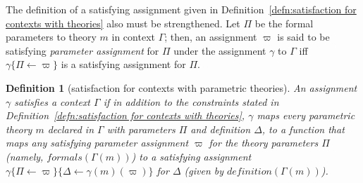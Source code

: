 \documentclass [12pt,twoside]{cslreport}
\newcommand{\thmbox}
   {{\ \hfill\hbox{%
      \vrule width1.0ex height1.0ex
   }\parfillskip 0pt }}
\newcommand{\Mgamma}[1]{{\mathcal M}(\Gamma\vbar\gamma)(#1)}
\newcommand{\tttype}{\mathtt{TYPE}}
\newcommand{\ttconstant}{\mathtt{CONSTANT}}
\newcommand{\itkind}{\textit{kind}}
\newcommand{\itdef}{\textit{definition}}
\newcommand{\itformals}{\textit{formals}}
\newcommand{\vbar}{\ |\ }
\newtheorem{definition}{Definition}
\newenvironment{Defn}[1]{\begin{definition}[#1]\label{defn:#1}}{
\thmbox\end{definition}}
\begin{document}
The definition of a satisfying assignment given in
Definition~\ref{defn:satisfaction for contexts with theories} 
also must be strengthened.    
Let $\Pi$ be the
formal parameters to theory $m$ in context $\Gamma$; then, an assignment
$\varpi$ is 
said to be satisfying {\em parameter assignment} for $\Pi$ under the
assignment $\gamma$ to $\Gamma$ 
iff $\gamma\{\Pi\gets \varpi\}$ is a satisfying assignment for $\Pi$\@.  
\begin{Defn}{satisfaction for contexts with parametric theories}
An assignment
$\gamma$ satisfies a context $\Gamma$ if in addition to the 
constraints stated in
Definition~\ref{defn:satisfaction for contexts with theories}, $\gamma$ maps 
every parametric theory $m$  declared in $\Gamma$ with parameters $\Pi$
and definition $\Delta$, 
to a function that maps
any satisfying parameter assignment $\varpi$ for the theory parameters $\Pi$
(namely, 
$\itformals(\Gamma(m))$) to a satisfying assignment $\gamma\{\Pi\gets
\varpi\}\{\Delta \gets \gamma(m)(\varpi)\}$ for 
$\Delta$ (given by 
$\itdef{}(\Gamma(m))$).
\begin{comment}
That is, 
for each declared symbol $s$ in
$\Delta$: 
\begin{enumerate}
\item If $ \itkind{}(\Gamma(m)(s)) = \tttype{}$, then
$\gamma(m)(\Mgamma{\sigma})(s)
\in U$
%
\item if $\itkind{}(\Gamma(m)(s)) = \ttconstant{}$, then $\gamma(m)(\Mgamma{\sigma})(s)
\in \mathcal{M}(\Gamma| \gamma;\{\Pi\gets \Mgamma{\sigma}\};\gamma(m)(\Mgamma{\sigma})(\tau(\Gamma)(m[\sigma].s)))$
%
\item if $\itdef{}(\Gamma(m)(s))$ is defined,
then $\gamma(m)(\Mgamma{\sigma})(s) = \mathcal{M}(\Gamma| \gamma;
\{\Pi\gets \Mgamma{\sigma}\}; \gamma(m)(\Mgamma{\sigma}))(
\itdef{}(\Gamma(m)(s)))$.
\end{enumerate}
\end{comment}
\end{Defn}


\begin{comment}
This map preserves the
assignments given to the parameters so that if for $s : T$ in $\Pi$,
$m[\sigma]$ is such that the formal $s$ is matched with the actual $a$,
then 
$\gamma(m)(\{\Pi\gets \Mgamma{\sigma}\})(s)$ must be $\Mgamma{a}$\@.
\end{comment}
\begin{comment}
The delicate point here is that $\gamma(m)$ is not a set but a map (a
rule) that maps a given assignment (a set) of sets to symbols, to another
assignment of sets to symbols.  This means that $\gamma$ itself is not a
set.  There is no reason why $\gamma$ should be a set since all we require
is that it map a given type name to a set, and a constant to an element
of the set representing its type.  
\end{comment}
\begin{comment}
\begin{eqnarray*}
  \Mgamma{m[\sigma].s} & = & \gamma(m)(\{\Pi\gets \Mgamma(\sigma)\})(s)
\end{eqnarray*}
\end{comment}
\end{document}

